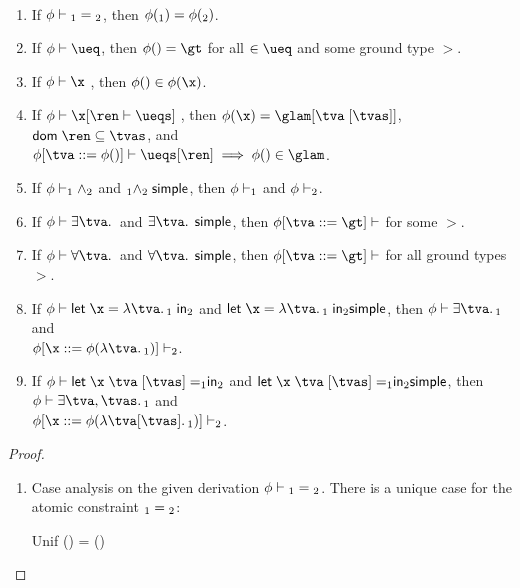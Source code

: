 \documentclass[acmsmall,screen,nonacm,review]{acmart}
\begin{document}
\begin{lemma}~
  \label{lem:simple-inversion}
  \begin{enumerate}[(\roman*)]
    \item If $\phi \vdash {\relax_1} = {\relax_2}$, then $\phi(\relax_1) = \phi(\relax_2)$.
    \item If $\semenv \th \ueq$, then $\semenv(\t) = \gt$ for all $\t \in \ueq$ and some ground type $\gt$.
    \item If $\semenv \th \capp \x \t$, then $\semenv(\t) \in \semenv(\x)$.
    \item If $\semenv \th \cpapp \x \ren \ueqs$, then $\semenv(\x) = \gabsr \tv \tvs$, $\dom \ren \subseteq \tvs$, and \\$\semenv\where{\tv \is \semenv(\t)} \th \ueqs\where\ren \implies \semenv(\t) \in \glam$.

    \item If $\phi \vdash \relax_1 \wedge \relax_2$ and $\relax_1 \wedge \relax_2 \mathrel{\mathsf{simple}}\mathclose{}$, then $\phi \vdash \relax_1$ and $\phi \vdash \relax_2$.
    \item If $\semenv \th \cexists \tv \c$ and $\cexists \tv \c \simple$, then $\semenv\where{\tv \is \gt} \th \c$ for some $\gt$.
    \item If $\semenv \th \cfor \tv \c$ and $\cfor \tv \c \simple$, then $\semenv\where{\tv \is \gt} \th \c$ for all ground types $\gt$.
    \item If $\semenv \th \clet \x \tv \cone \ctwo$ and $\clet \x \tv \cone \ctwo \simple$, then $\semenv \th \cexists \tv \cone$ and \\$\semenv\where{\x \is \semenv(\cabs \tv \cone)} \th \ctwo$.
    \item If $\semenv \th \cletr \x \tv \tvs \cone \ctwo$ and $\cletr \x \tv \tvs \cone \ctwo \simple$, then
      $\semenv \th \cexists {\tv, \tvs} \cone$ and \\$\semenv\where{\x \is \semenv(\cabsr \tv \tvs \cone)} \th \ctwo$.
  \end{enumerate}
  \begin{proof}~
    \begin{enumerate}[(\roman*)]
      \item Case analysis on the given derivation $\phi \vdash {\relax_1} = {\relax_2}$.
	There is a unique case for the atomic constraint ${\relax_1} = {\relax_2}$:
	\begin{itemize}
	    \proofcasederivation
	      {Unif}
	      {\semenv(\tone) = \semenv(\ttwo)}
	      {\semenv \th \cunif \tone \ttwo}


\end{itemize}
\end{enumerate}
\end{proof}
\end{lemma}
\end{document}
